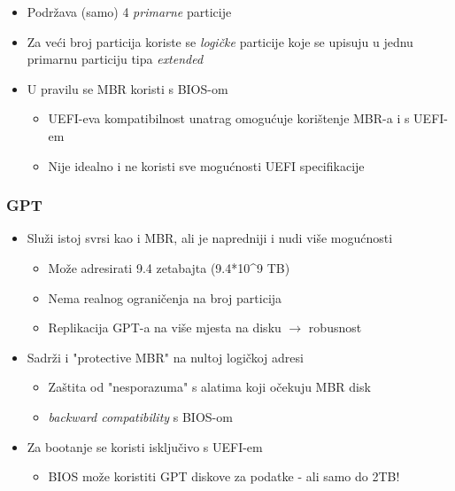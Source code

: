 \documentclass[t]{beamer}
\begin{document}
\begin{frame}
	\begin{itemize}
		\item Podržava (samo) 4 \emph{primarne} particije
		\item Za veći broj particija koriste se \emph{logičke} particije koje se upisuju u jednu primarnu particiju tipa \emph{extended}
		\item U pravilu se MBR koristi s BIOS-om
		\begin{itemize}
			\item UEFI-eva kompatibilnost unatrag omogućuje korištenje MBR-a i s UEFI-em
			\item Nije idealno i ne koristi sve mogućnosti UEFI specifikacije
		\end{itemize}
	\end{itemize}
\end{frame}

\begin{frame}
	\frametitle{GPT}
	\begin{itemize}
		\item Služi istoj svrsi kao i MBR, ali je napredniji i nudi više mogućnosti
		\begin{itemize}
			\item Može adresirati 9.4 zetabajta (9.4*10\textasciicircum9 TB)
			\item Nema realnog ograničenja na broj particija
			\item Replikacija GPT-a na više mjesta na disku $\longrightarrow$ robusnost
		\end{itemize}
		\item Sadrži i "protective MBR" na nultoj logičkoj adresi
		\begin{itemize}
			\item Zaštita od "nesporazuma" s alatima koji očekuju MBR disk
			\item \textit{backward compatibility} s BIOS-om
		\end{itemize}
		\item Za bootanje se koristi isključivo s UEFI-em
		\begin{itemize}
			\item BIOS može koristiti GPT diskove za podatke - ali samo do 2TB!
		\end{itemize}
	\end{itemize}
\end{frame}
\end{document}
